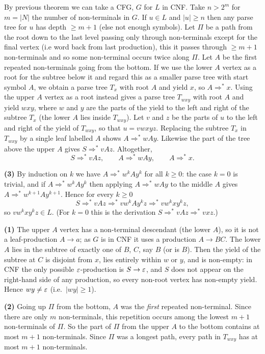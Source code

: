 \documentclass[tikx, border = 10pt]{article}
\begin{document}
\pf By previous theorem we can take a CFG, $ G $ for $ L $ in CNF. Take $ n > 2^m $ for $ m = |N| $ the number of non-terminals in $ G $. If $ u\in L $ and $ |u| \ge n $ then any parse tree for $ u $ has depth $ \ge m + 1 $ (else not enough symbols). Let $ \Pi $ be a path from the root down to the last level passing only through non-terminals except for the final vertex (i.e word back from last production), this it passes through $ \ge m +1 $ non-terminals and so some non-terminal occurs twice along $ \Pi $. Let $ A $ be the first repeated non-terminals going from the bottom. If we use the lower $ A $ vertex as a root for the subtree below it and regard this as a smaller parse tree with start symbol $ A $, we obtain 
a parse tree $T_x$ with root $A$ and yield $x$, so $A\Rightarrow^* x$. Using the upper
$A$ vertex as a root instead gives a parse tree $T_{wxy}$ with root $A$ and yield
$wxy$, where $w$ and $y$ are the parts of the yield to the left and right of the
subtree $T_x$ (the lower $A$ lies inside $T_{wxy}$). Let $v$ and $z$ be the parts of $u$
to the left and right of the yield of $T_{wxy}$, so that $u = vwxyz$. Replacing the
subtree $T_x$ in $T_{wxy}$ by a single leaf labelled $A$ shows $A \Rightarrow^* wAy$.
Likewise the part of the tree above the upper $A$ gives $S \Rightarrow^* vAz$. Altogether,
\[
  S \Rightarrow^* vAz, \qquad A \Rightarrow^* wAy, \qquad A \Rightarrow^* x .
\]

\textbf{(3)} By induction on $k$ we have $A \Rightarrow^* w^k A y^k$ for all $k\ge 0$: the case
$k=0$ is trivial, and if $A\Rightarrow^* w^kAy^k$ then applying $A\Rightarrow^* wAy$ to the
middle $A$ gives $A\Rightarrow^* w^{k+1}Ay^{k+1}$. Hence for every $k\ge 0$
\[
  S \Rightarrow^* vAz \Rightarrow^* v w^k A y^k z \Rightarrow^* v w^k x y^k z,
\]
so $vw^kxy^kz \in L$. (For $k=0$ this is the derivation $S\Rightarrow^* vAz\Rightarrow^* vxz$.)

\textbf{(1)} The upper $A$ vertex has a non-terminal descendant (the lower $A$), so it is not
a leaf-production $A\to a$; as $G$ is in CNF it uses a production $A\to BC$. The lower $A$
lies in the subtree of exactly one of $B$, $C$, say $B$ (or is $B$). Then the yield of the
subtree at $C$ is disjoint from $x$, lies entirely within $w$ or $y$, and is non-empty:
in CNF the only possible $\varepsilon$-production is $S\to\varepsilon$, and $S$ does not appear on the
right-hand side of any production, so every non-root vertex has non-empty yield. Hence
$wy\neq\varepsilon$ (i.e.\ $|wy|\ge 1$).

\textbf{(2)} Going up $\Pi$ from the bottom, $A$ was the \emph{first} repeated non-terminal.
Since there are only $m$ non-terminals, this repetition occurs among the lowest $m+1$
non-terminals of $\Pi$. So the part of $\Pi$ from the upper $A$ to the bottom contains at
most $m+1$ non-terminals. Since $\Pi$ was a longest path, every path in $T_{wxy}$ has at
most $m+1$ non-terminals.
\end{document}
